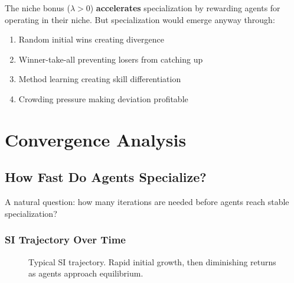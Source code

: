 \documentclass[11pt,a4paper]{article}
\theoremstyle{definition}
\theoremstyle{plain}
\begin{document}
\begin{intuition}
The niche bonus ($\lambda > 0$) \textbf{accelerates} specialization by rewarding agents for operating in their niche. But specialization would emerge anyway through:
\begin{enumerate}
    \item Random initial wins creating divergence
    \item Winner-take-all preventing losers from catching up
    \item Method learning creating skill differentiation
    \item Crowding pressure making deviation profitable
\end{enumerate}
\end{intuition}

\section{Convergence Analysis}

\subsection{How Fast Do Agents Specialize?}

A natural question: how many iterations are needed before agents reach stable specialization?

\subsubsection{SI Trajectory Over Time}

\begin{figure}[h]
\centering
{}
\caption{Typical SI trajectory. Rapid initial growth, then diminishing returns as agents approach equilibrium.}
\end{figure}
\end{document}
